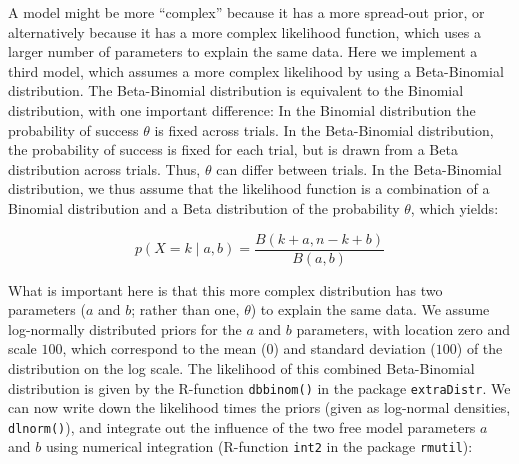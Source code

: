 \documentclass[12pt,]{krantz}
\theoremstyle{definition}
\theoremstyle{definition}
\theoremstyle{definition}
\theoremstyle{remark}
\begin{document}
A model might be more ``complex'' because it has a more spread-out prior, or alternatively because it has a more complex likelihood function, which uses a larger number of parameters to explain the same data. Here we implement a third model, which assumes a more complex likelihood by using a Beta-Binomial distribution. The Beta-Binomial distribution is equivalent to the Binomial distribution, with one important difference: In the Binomial distribution the probability of success \(\theta\) is fixed across trials. In the Beta-Binomial distribution, the probability of success is fixed for each trial, but is drawn from a Beta distribution across trials. Thus, \(\theta\) can differ between trials. In the Beta-Binomial distribution, we thus assume that the likelihood function is a combination of a Binomial distribution and a Beta distribution of the probability \(\theta\), which yields:

\begin{equation}
p(X = k \mid a, b) = \frac{B(k+a, n-k+b)}{B(a,b)}
\end{equation}

What is important here is that this more complex distribution has two parameters (\(a\) and \(b\); rather than one, \(\theta\)) to explain the same data. We assume log-normally distributed priors for the \(a\) and \(b\) parameters, with location zero and scale \(100\), which correspond to the mean (\(0\)) and standard deviation (\(100\)) of the distribution on the log scale. The likelihood of this combined Beta-Binomial distribution is given by the R-function \texttt{dbbinom()} in the package \texttt{extraDistr}. We can now write down the likelihood times the priors (given as log-normal densities, \texttt{dlnorm()}), and integrate out the influence of the two free model parameters \(a\) and \(b\) using numerical integration (R-function \texttt{int2} in the package \texttt{rmutil}):
\end{document}
